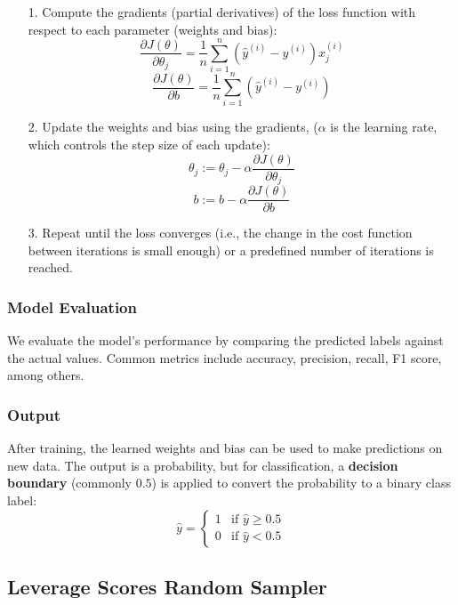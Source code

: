 \documentclass{article}
\theoremstyle{plain}
\theoremstyle{definition}
\theoremstyle{remark}
\begin{document}
\begin{itemize}

\item[1.] Compute the gradients (partial derivatives) of the loss function with respect to each parameter (weights and bias):
$$
\frac{\partial J(\theta)}{\partial \theta_j} = \frac{1}{n} \sum_{i=1}^{n} \left( \hat{y}^{(i)} - y^{(i)} \right) x_j^{(i)}
$$
$$
\frac{\partial J(\theta)}{\partial b} = \frac{1}{n} \sum_{i=1}^{n} \left( \hat{y}^{(i)} - y^{(i)} \right)
$$

\item[2.] Update the weights and bias using the gradients, ($\alpha$ is the learning rate, which controls the step size of each update):
$$
\theta_j := \theta_j - \alpha \frac{\partial J(\theta)}{\partial \theta_j}
$$
$$
b := b - \alpha \frac{\partial J(\theta)}{\partial b}
$$

\item[3.] Repeat until the loss converges (i.e., the change in the cost function between iterations is small enough) or a predefined number of iterations is reached.

\end{itemize}


\subsubsection{Model Evaluation}

We evaluate the model’s performance by comparing the predicted labels against the actual values. Common metrics include accuracy, precision, recall, F1 score, among others.


\subsubsection{Output}

After training, the learned weights and bias can be used to make predictions on new data. The output is a probability, but for classification, a \textbf{decision boundary} (commonly $0.5$) is applied to convert the probability to a binary class label:
$$
\hat{y} = \begin{cases}
1 & \text{if } \hat{y} \geq 0.5 \\
0 & \text{if } \hat{y} < 0.5
\end{cases}
$$


\subsection{Leverage Scores Random Sampler}
\end{document}
